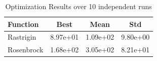 \begin{table}[ht]
\centering
\caption{Optimization Results over 10 independent runs}
\label{tab:results}
\begin{tabular}{lccc}
\toprule
\textbf{Function} & \textbf{Best} & \textbf{Mean} & \textbf{Std} \\
\midrule
Rastrigin & 8.97e+01 & 1.09e+02 & 9.80e+00 \\
Rosenbrock & 1.68e+02 & 3.05e+02 & 8.21e+01 \\
\bottomrule
\end{tabular}
\end{table}
